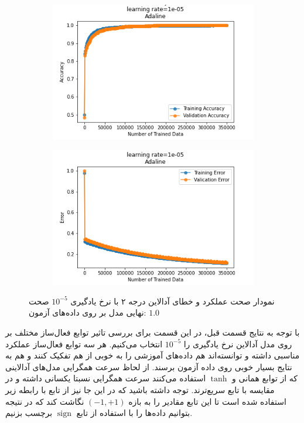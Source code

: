 \documentclass[12pt, a4paper]{article}
\DeclareMathOperator{\sign}{sign}
\begin{document}
\begin{figure}[h]
    \begin{subfigure}{0.45\linewidth}
        \centering
        \includegraphics[width=\linewidth]{images/6/adaline/lr/acc_1e-05.png}
    \end{subfigure}
    \hfil
    \begin{subfigure}{0.45\linewidth}
        \centering
        \includegraphics[width=\linewidth]{images/6/adaline/lr/error_1e-05.png}
    \end{subfigure}
    \caption{نمودار صحت عملکرد‌ و خطای آدالاین درجه ۲ با نرخ یادگیری $10^{-5}$
    \newline
    صحت نهایی مدل بر روی داده‌های آزمون: $1.0$}
\end{figure}

\vspace{1cm}

با توجه به نتایج قسمت قبل، در این قسمت برای بررسی تاثیر توابع فعال‌ساز مختلف بر روی مدل آدالاین
نرخ یادگیری را $10^{-5}$ انتخاب می‌کنیم. هر سه توابع فعال‌ساز عملکرد مناسبی داشته و توانسته‌اند
هم داده‌های آموزشی را به خوبی از هم تفکیک کنند و هم به نتایج بسیار خوبی روی داده آزمون برسند.
از لحاظ سرعت همگرایی مدل‌های آدالاینی که از توابع همانی و $\tanh$ استفاده می‌کنند سرعت همگرایی نسبتا
یکسانی داشته و در مقایسه با تابع  سریع‌ترند. توجه داشته باشید که در این جا نیز
از تابع  با رابطه زیر استفاده شده است تا این تابع مقادیر را به بازه $(-1,+1)$ نگاشت کند
که در نتیجه بتوانیم داده‌ها را با استفاده از تابع $\sign$ برچسب بزنیم.
\end{document}
